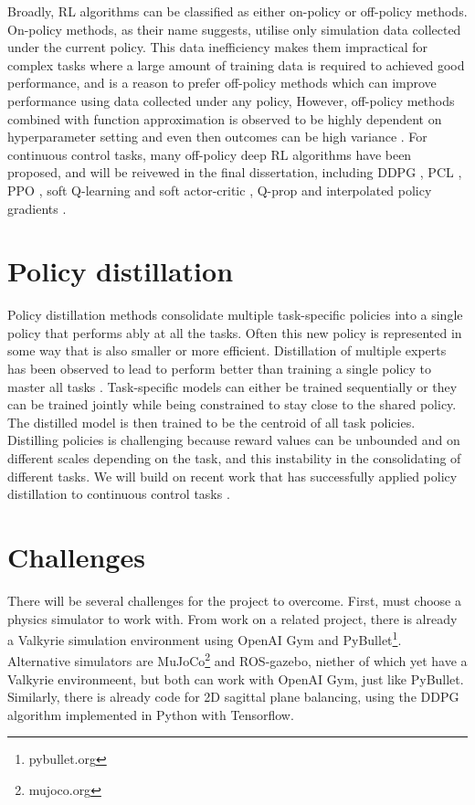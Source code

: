 \documentclass[a4paper]{article}
\begin{document}
Broadly,  RL algorithms can be classified as either on-policy or off-policy methods. On-policy methods, as their name suggests, utilise only simulation data collected under the current policy. This data inefficiency makes them impractical for complex tasks where a large amount of training data is required to achieved good performance, and is a reason to prefer off-policy methods which can improve performance using data collected under any policy, However, off-policy methods combined with function approximation is observed to be highly dependent on hyperparameter setting and even then outcomes can be high variance \cite{nachum2017trust}. For continuous control tasks, many off-policy deep RL algorithms have been proposed, and will be reivewed in the final dissertation, including DDPG \citep{lillicrap2015continuous}, PCL \citep{nachum2017bridging, nachum2017trust}, PPO \citep{schulman2017proximal}, soft Q-learning \citep{haarnoja2018composable} and soft actor-critic \citep{haarnoja2018soft}, Q-prop \citep{gu2016q} and interpolated policy gradients \citep{gu2017interpolated}.

\section{Policy distillation}
Policy distillation methods consolidate multiple task-specific policies into a single policy that performs ably at all the tasks. Often this new policy is represented in some way that is also smaller or more efficient. Distillation of multiple experts has been observed to lead to perform better than training a single policy to master all tasks \citep{rusu2015policy}.
 Task-specific models can either be trained sequentially or they can be trained jointly while being constrained to stay close to the shared policy. The distilled model is then trained to be the centroid of all task policies. Distilling policies is challenging because reward values can be unbounded and on different scales depending on the task, and this instability in the consolidating of different tasks. We will build on recent work that has successfully applied policy distillation to continuous control tasks \citep{teh2017distral, berseth2018progressive}.


\section{Challenges}
There will be several challenges for the project to overcome. First,  must choose a physics simulator to work with. From work on a related project, there is already a Valkyrie simulation environment using OpenAI Gym \citep{brockman2016openai} and
 PyBullet\footnote{pybullet.org}. Alternative simulators are MuJoCo\footnote{mujoco.org} and ROS-gazebo, niether of which yet have a Valkyrie environmeent, but both can work with OpenAI Gym, just like PyBullet. Similarly, there is already code for 2D sagittal plane balancing, using the DDPG algorithm implemented in Python with Tensorflow. 
\end{document}

